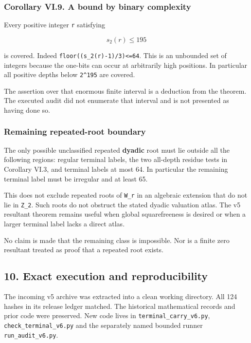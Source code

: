 \documentclass[11pt,letterpaper]{article}
\begin{document}
\subsubsection{Corollary VI.9. A bound by binary complexity}\label{corollary-vi.9.-a-bound-by-binary-complexity}

Every positive integer \texttt{r} satisfying

\[
\boxed{s_2(r)\le195} \tag{VI.17}
\]

is covered. Indeed \texttt{floor((s\_2(r)-1)/3)\textless{}=64}. This is an unbounded set of integers because the one-bits can occur at arbitrarily high positions. In particular all positive depths below \texttt{2\^{}195} are covered.

The assertion over that enormous finite interval is a deduction from the theorem. The executed audit did not enumerate that interval and is not presented as having done so.

\subsubsection{Remaining repeated-root boundary}\label{remaining-repeated-root-boundary}

The only possible unclassified repeated \textbf{dyadic} root must lie outside all the following regions: regular terminal labels, the two all-depth residue tests in Corollary VI.3, and terminal labels at most 64. In particular the remaining terminal label must be irregular and at least 65.

This does not exclude repeated roots of \texttt{W\_r} in an algebraic extension that do not lie in \texttt{Z\_2}. Such roots do not obstruct the stated dyadic valuation atlas. The v5 resultant theorem remains useful when global squarefreeness is desired or when a larger terminal label lacks a direct atlas.

No claim is made that the remaining class is impossible. Nor is a finite zero resultant treated as proof that a repeated root exists.

\subsection{10. Exact execution and reproducibility}\label{exact-execution-and-reproducibility}

The incoming v5 archive was extracted into a clean working directory. All 124 hashes in its release ledger matched. The historical mathematical records and prior code were preserved. New code lives in \texttt{terminal\_carry\_v6.py}, \texttt{check\_terminal\_v6.py} and the separately named bounded runner \texttt{run\_audit\_v6.py}.
\end{document}
